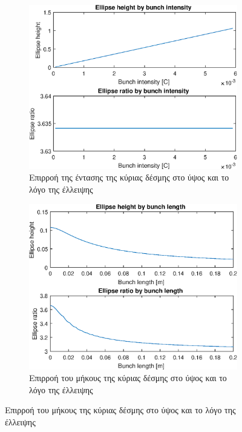 \begin{figure}[tph]	
	\begin{subfigure}{0.47\textwidth}
		\includegraphics[width=\linewidth]{figures/MATLAB-variable-analysis/EBS-variables-intensity}
		\centering
		\caption{Επιρροή της έντασης της κύριας δέσμης στο ύψος και το λόγο της έλλειψης}
		\label{fig:EBS-variables-intensity}
	\end{subfigure}
	\hfill
	\begin{subfigure}{0.47\textwidth}
		\includegraphics[width=\linewidth]{figures/MATLAB-variable-analysis/EBS-variables-length}
		\centering
		\caption{Επιρροή του μήκους της κύριας δέσμης στο ύψος και το λόγο της έλλειψης}

\end{subfigure}
\end{figure}
